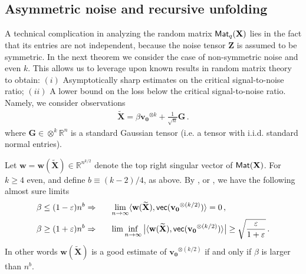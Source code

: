 \documentclass[11pt]{article}
\theoremstyle{definition}
\def\<{\langle}
\def\>{\rangle}
\def\reals{\mathbb{R}}
\def\bw{\mathbf{w}}
\def\bvz{\mathbf{v_0}}
\def\bX{\mathbf{X}}
\def\btX{\mathbf{\widetilde{X}}}
\def\vec{{\sf{vec}}}
\def\bZ{\mathbf{Z}}
\def\bG{\mathbf{G}}
\def\ok{{^{\otimes k}}}
\def\M{{\sf Mat}}
\def\eps{\varepsilon}
\begin{document}
\subsection{Asymmetric noise and recursive unfolding}

A technical complication in analyzing the random matrix $\M_q(\bX)$
lies in the fact that  its entries are not independent, because the
noise tensor $\bZ$ is assumed to be symmetric. 
In the next theorem we consider the case of 
non-symmetric noise and even $k$. This allows us to leverage upon
known results in random matrix theory \cite{paul2007asymptotics,feral2009largest,benaych2012singular} to obtain: $(i)$ Asymptotically
sharp estimates on the critical signal-to-noise ratio; $(ii)$ A lower
bound on the loss below the critical signal-to-noise ratio.
 Namely, we consider observations
%
\begin{align}
%
\btX  =\beta \bvz\ok + \frac{1}{\sqrt{n}}\bG\, . \label{eq:NonSymm}
%
\end{align}
%
where $\bG \in \otimes^k\reals^n$ is a standard Gaussian tensor
(i.e. a tensor with i.i.d. standard normal entries).

 Let $\bw=\bw(\btX)\in\reals^{n^{k/2}}$  denote the top right singular vector of
$\M(\bX)$. For $k\ge 4$ even, and define $b \equiv (k-2)/4$, as above.
By \cite[Theorem 4]{paul2007asymptotics},  or \cite[Theorem
2.3]{benaych2012singular}, we
have the following almost sure limits
%
\begin{align}
%
\beta\le  (1-\eps)n^{b} & \Rightarrow \;\;\;\;\;\;
\lim_{n\to\infty}\<\bw(\btX),\vec(\bvz^{\otimes  (k/2)})\> = 0\, ,\label{eq:TightPhTr1}\\
\beta\ge  (1+\eps)n^{b} & \Rightarrow \;\;\;\;\;\;
\lim\inf_{n\to\infty}\big|\<\bw(\btX),\vec(\bvz^{\otimes  (
k/2)})\>\big| \ge  \sqrt{\frac{\eps}{1+\eps}}\, .\label{eq:TightPhTr2}
%
\end{align}
%
In other words $\bw(\btX)$ is a good estimate of $\bvz^{\otimes
  (k/2)}$ if and only if $\beta$ is larger than $n^b$. 
\end{document}
